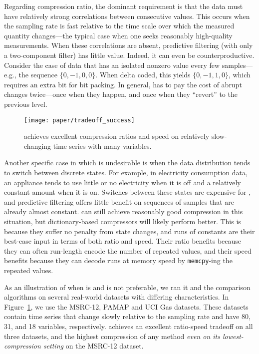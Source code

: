 Regarding compression ratio, the dominant requirement is that the data must have relatively strong correlations between consecutive values. This occurs when the sampling rate is fast relative to the time scale over which the measured quantity changes---the typical case when one seeks reasonably high-quality measurements. When these correlations are absent, predictive filtering (with only a two-component filter) has little value. Indeed, it can even be counterproductive. Consider the case of data that has an isolated nonzero value every few samples---e.g., the sequence $\{0, -1, 0, 0\}$. When delta coded, this yields $\{0, -1, 1, 0\}$, which requires an extra bit for \minesp bit packing. In general, \minesp has to pay the cost of abrupt changes twice---once when they happen, and once when they ``revert'' to the previous level.

\begin{figure}[t]
\begin{center}
    \texttt{[image: paper/tradeoff\_success]}
    \caption{\minesp achieves excellent compression ratios and speed on relatively slow-changing time series with many variables.}
    \label{fig:tradeoff_success}
\end{center}
    \vspace{-5mm}
\end{figure}

Another specific case in which \minesp is undesirable is when the data distribution tends to switch between discrete states. For example, in electricity consumption data, an appliance tends to use little or no electricity when it is off and a relatively constant amount when it is on. Switches between these states are expensive for \mine, and predictive filtering offers little benefit on sequences of samples that are already almost constant. \minesp can still achieve reasonably good compression in this situation, but dictionary-based compressors will likely perform better. This is because they suffer no penalty from state changes, and runs of constants are their best-case input in terms of both ratio and speed. Their ratio benefits because they can often run-length encode the number of repeated values, and their speed benefits because they can decode runs at memory speed by \texttt{memcpy}-ing the repeated values.

As an illustration of when \minesp is and is not preferable, we ran it and the comparison algorithms on several real-world datasets with differing characteristics. In Figure~\ref{fig:tradeoff_success}, we use the MSRC-12, PAMAP and UCI Gas datasets. These datasets contain time series that change slowly relative to the sampling rate and have 80, 31, and 18 variables, respectively. \minesp achieves an excellent ratio-speed tradeoff on all three datasets, and the highest compression of any method \textit{even on its lowest-compression setting} on the MSRC-12 dataset.

